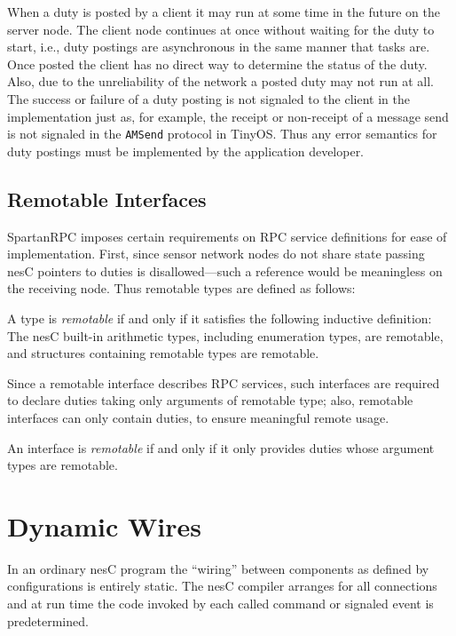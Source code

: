 When a duty is posted by a client it may run at some time in the future on the server node. The
client node continues at once without waiting for the duty to start, i.e., duty postings are
asynchronous in the same manner that tasks are. Once posted the client has no direct way to
determine the status of the duty. Also, due to the unreliability of the network a posted duty
may not run at all. The success or failure of a duty posting is not signaled to the client in
the implementation just as, for example, the receipt or non-receipt of a message send is not
signaled in the \texttt{AMSend} protocol in TinyOS. Thus any error semantics for duty postings
must be implemented by the application developer.

\subsection{Remotable Interfaces}
\label{section-remotable}

SpartanRPC imposes certain requirements on RPC service definitions for ease of implementation.
First, since sensor network nodes do not share state passing nesC pointers to duties is
disallowed---such a reference would be meaningless on the receiving node. Thus remotable types
are defined as follows:
\begin{definition}
  A type is \emph{remotable} if and only if it satisfies the following inductive definition: The
  nesC built-in arithmetic types, including enumeration types, are remotable, and structures
  containing remotable types are remotable.
\end{definition}
Since a remotable interface describes RPC services, such interfaces are required to declare
duties taking only arguments of remotable type; also, remotable interfaces can only contain
duties, to ensure meaningful remote usage.
\begin{definition}
  An interface is \emph{remotable} if and only if it only provides duties whose argument types
  are remotable.
\end{definition}

\section{Dynamic Wires}
\label{section-dynamic-wires}

In an ordinary nesC program the ``wiring'' between components as defined by configurations is
entirely static. The nesC compiler arranges for all connections and at run time the code invoked
by each called command or signaled event is predetermined.

